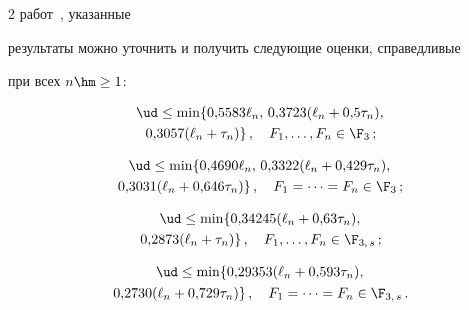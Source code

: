 \begin{multicols}{2}
работ~\cite{Rossberg1991, MatysiakSzablowski2001}, указанные

результаты можно уточнить и получить следующие оценки, справедливые

при всех $n\hm\ge1$:

\begin{multline*}

\ud\le \min\{0{,}5583\ell_n,\, 0{,}3723(\ell_n+0{,}5\tau_n),\\

\,0{,}3057(\ell_n+\tau_n)\}\,,\quad F_1,\ldots,F_n\in\F_3\,;

\end{multline*}



\vspace*{-12pt}



\noindent

\begin{multline*}

\ud\le \min\{0{,}4690\ell_n,\, 0{,}3322(\ell_n+0{,}429\tau_n),\\

\,0{,}3031(\ell_n+0{,}646\tau_n)\}\,,\quad F_1=\cdots=F_n\in\F_3\,;

\end{multline*}



\vspace*{-12pt}



\noindent

\begin{multline*}

\ud\le \min\{ 0{,}34245(\ell_n+0{,}63\tau_n),\\

\,0{,}2873(\ell_n+\tau_n)\}\,,\quad F_1,\ldots,F_n\in\F_{3,\,s}\,;

\end{multline*}



\vspace*{-12pt}



\noindent

\begin{multline*}

\ud\le \min\{ 0{,}29353(\ell_n+0{,}593\tau_n),\\

\,0{,}2730(\ell_n+0{,}729\tau_n)\}\,,\quad F_1=\cdots=F_n\in\F_{3,\,s}\,.


\end{multline*}
\end{multicols}
